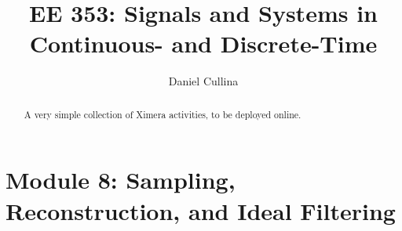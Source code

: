 \documentclass{xourse}
\author{Daniel Cullina}
\title{EE 353: Signals and Systems in Continuous- and Discrete-Time}
\begin{document}
\begin{abstract}
    A very simple collection of Ximera activities, 
    to be deployed online.
\end{abstract}
\maketitle
\part{Module 8: Sampling, Reconstruction, and Ideal Filtering}
\chapterstyle
{}
\end{document}
